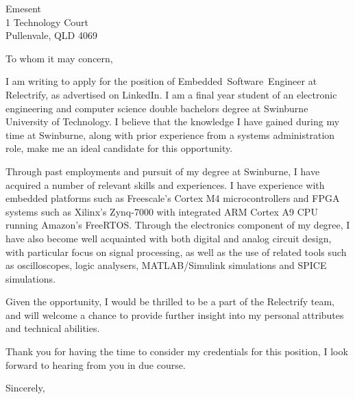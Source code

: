 \documentclass[
    backaddress=false,
    foldmarks=false,
    fromalign=right,
    fromrule,
    fromphone,
    fromemail,
    parskip=half,
    refline=nodate
]{scrlttr2}
\begin{document}
    


    \renewcommand*\raggedsignature{\raggedright}

    \begin{letter}{%
        Emesent            \\
        1 Technology Court \\
        Pullenvale, QLD 4069}
        \opening{To whom it may concern,}
        I am writing to apply for the position of Embedded~Software~Engineer at Relectrify, as advertised on LinkedIn. I am a final year student of an electronic engineering and computer science double bachelors degree at Swinburne University of Technology. I believe that the knowledge I have gained during my time at Swinburne, along with prior experience from a systems administration role, make me an ideal candidate for this opportunity.

        Through past employments and pursuit of my degree at Swinburne, I have acquired a number of relevant skills and experiences. I have experience with embedded platforms such as Freescale's Cortex M4 microcontrollers and FPGA systems such as Xilinx's Zynq-7000 with integrated ARM Cortex A9 CPU running Amazon's FreeRTOS. Through the electronics component of my degree, I have also become well acquainted with both digital and analog circuit design, with particular focus on signal processing, as well as the use of related tools such as oscilloscopes, logic analysers, MATLAB/Simulink simulations and SPICE simulations.

        Given the opportunity, I would be thrilled to be a part of the Relectrify team, and will welcome a chance to provide further insight into my personal attributes and technical abilities. 

        Thank you for having the time to consider my credentials for this position, I look forward to hearing from you in due course.

        \closing{Sincerely,}
    \end{letter}
\end{document}
